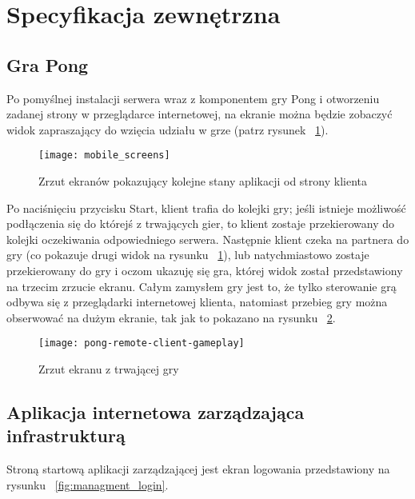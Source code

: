 \newpage
\section{Specyfikacja zewnętrzna}
\label{sec:spec-out}

\subsection{Gra Pong}

Po pomyślnej instalacji serwera wraz z komponentem gry Pong i otworzeniu zadanej strony w przeglądarce internetowej, na ekranie można będzie zobaczyć widok zapraszający do wzięcia udziału w grze (patrz rysunek ~\ref{fig:mobile_screens}). 
\begin{figure}
\begin{center}
	\texttt{[image: mobile\_screens]}
\end{center}
\caption{Zrzut ekranów pokazujący kolejne stany aplikacji od strony klienta}
\label{fig:mobile_screens}
\end{figure}

Po naciśnięciu przycisku Start, klient trafia do kolejki gry; jeśli istnieje możliwość podłączenia się do którejś z trwających gier, to klient zostaje przekierowany do kolejki oczekiwania odpowiedniego serwera. Następnie klient czeka na partnera do gry (co pokazuje drugi widok na rysunku ~\ref{fig:mobile_screens}), lub natychmiastowo zostaje przekierowany do gry i oczom ukazuję się gra, której widok został przedstawiony na trzecim zrzucie ekranu. Całym zamysłem gry jest to, że tylko sterowanie grą odbywa się z przeglądarki internetowej klienta, natomiast przebieg gry można obserwować na dużym ekranie, tak jak to pokazano na rysunku ~\ref{fig:pong-gameplay}.

\begin{figure}
\begin{center}
    \texttt{[image: pong-remote-client-gameplay]}
\end{center}
\caption{Zrzut ekranu z trwającej gry}
\label{fig:pong-gameplay}
\end{figure}



\subsection{Aplikacja internetowa zarządzająca infrastrukturą}

Stroną startową aplikacji zarządzającej jest ekran logowania przedstawiony na rysunku ~\ref{fig:managment_login}.

